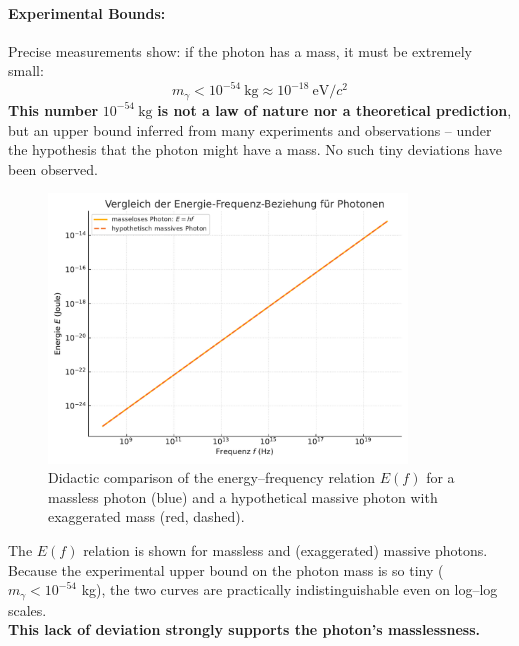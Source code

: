 \paragraph{Experimental Bounds:}
Precise measurements show: if the photon has a mass, it must be extremely small:
$$
m_\gamma < 10^{-54}~\text{kg} \approx 10^{-18}~\text{eV}/c^2
$$
\textbf{This number} $10^{-54}~\text{kg}$ \textbf{is not a law of nature nor a theoretical prediction}, but an upper bound inferred from many experiments and observations – under the hypothesis that the photon might have a mass. No such tiny deviations have been observed.

\begin{figure}[H]
	\centering
	\includegraphics[width=0.85\textwidth]{bilder/photon_energie_vergleich_didaktisch.pdf}
	\caption{Didactic comparison of the energy–frequency relation \( E(f) \) for a massless photon (blue) and a hypothetical massive photon with exaggerated mass (red, dashed).}
	\label{fig:energie_f_masselos_massiv}
\end{figure}
\vspace{1em}
\begin{tcolorbox}[hinweisbox, title=Why No Difference Is Visible in the Plot]
	\label{box:Warum sieht man}
	The $E(f)$ relation is shown for massless and (exaggerated) massive photons. Because the experimental upper bound on the photon mass is so tiny ($m_\gamma < 10^{-54}$ kg), the two curves are practically indistinguishable even on log–log scales. \\[1ex]
	\textbf{This lack of deviation strongly supports the photon’s masslessness.}
\end{tcolorbox}
\vspace{1em}

